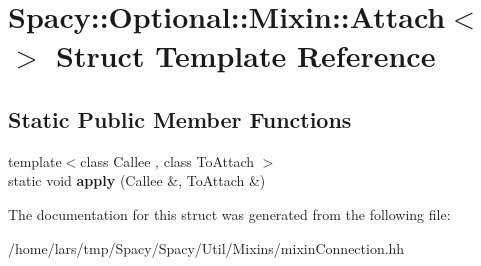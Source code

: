\hypertarget{structSpacy_1_1Optional_1_1Mixin_1_1Attach_3_4}{}\section{Spacy\+:\+:Optional\+:\+:Mixin\+:\+:Attach$<$$>$ Struct Template Reference}
\label{structSpacy_1_1Optional_1_1Mixin_1_1Attach_3_4}
\subsection*{Static Public Member Functions}
\begin{DoxyCompactItemize}
\item 
{\footnotesize template$<$class Callee , class To\+Attach $>$ }\\static void {\bfseries apply} (Callee \&, To\+Attach \&)\hypertarget{structSpacy_1_1Optional_1_1Mixin_1_1Attach_3_4_ae78568d36f4b9ee4ece2c501880fc894}{}\label{structSpacy_1_1Optional_1_1Mixin_1_1Attach_3_4_ae78568d36f4b9ee4ece2c501880fc894}

\end{DoxyCompactItemize}


The documentation for this struct was generated from the following file\+:\begin{DoxyCompactItemize}
\item 
/home/lars/tmp/\+Spacy/\+Spacy/\+Util/\+Mixins/mixin\+Connection.\+hh\end{DoxyCompactItemize}
